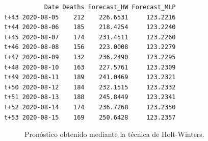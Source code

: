 \documentclass[
  us-letterpaper,
]{scrreprt}
\theoremstyle{plain}
\theoremstyle{definition}
\theoremstyle{definition}
\theoremstyle{plain}
\theoremstyle{remark}
\begin{document}
\newpage{}

\begin{verbatim}
           Date Deaths Forecast_HW Forecast_MLP
t+43 2020-08-05    212    226.6531     123.2216
t+44 2020-08-06    185    218.4254     123.2240
t+45 2020-08-07    174    231.4511     123.2260
t+46 2020-08-08    156    223.0008     123.2279
t+47 2020-08-09    132    236.2490     123.2295
t+48 2020-08-10    163    227.5761     123.2309
t+49 2020-08-11    189    241.0469     123.2321
t+50 2020-08-12    184    232.1515     123.2332
t+51 2020-08-13    188    245.8449     123.2341
t+52 2020-08-14    174    236.7268     123.2350
t+53 2020-08-15    169    250.6428     123.2357
\end{verbatim}

\begin{figure}


\caption{\label{fig-phwd}Pronóstico obtenido mediante la técnica de
Holt-Winters.}

\end{figure}%
\end{document}

